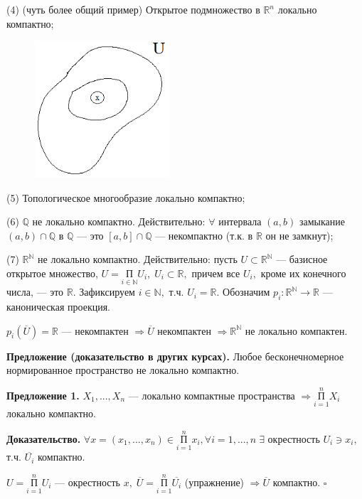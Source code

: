 \documentclass[12pt,a4paper]{article}
\begin{document}
(4) (чуть более общий пример) Открытое подмножество в $\mathbb{R}^{n}$ локально компактно; 

\begin{figure}
	\includegraphics[width = 5cm]{lect10_1.png}
\end{figure}

(5) Топологическое многообразие локально компактно;

(6) $\mathbb{Q}$ не локально компактно. Действительно: $\forall$ интервала $(a, b)$ замыкание $(a, b) \cap \mathbb{Q}$ в $\mathbb{Q}$ --- это $[a, b] \cap \mathbb{Q}$ --- некомпактно (т.к. в $\mathbb{R}$ он не замкнут);

(7) $\mathbb{R^{N}}$ не локально компактно. Действительно: пусть $U \subset \mathbb{R^{N}}$ --- базисное открытое множество, $U = \underset{i \in \mathbb{N}}{\text{П}} U_{i}, \; U_{i} \subset \mathbb{R},$ причем все $U_{i},$ кроме их конечного числа, --- это $\mathbb{R}.$ Зафиксируем $i \in \mathbb{N},$ т.ч. $U_{i} = \mathbb{R}.$ Обозначим $p_{i}\!: \mathbb{R^{N}} \to \mathbb{R}$ --- каноническая проекция. 

$p_{i}(\overline{U}) = \mathbb{R}$ --- некомпактен $\Rightarrow \overline{U}$ некомпактен $\Rightarrow \mathbb{R^{N}}$ не локально компактен.

\textbf{Предложение (доказательство в других курсах).} Любое бесконечномерное нормированное пространство не локально компактно.

\textbf{Предложение 1.} $X_{1}, ..., X_{n}$ --- локально компактные пространства $\Rightarrow \underset{i = 1}{\overset{n}{\text{П}}} X_{i}$ локально компактно.

\textbf{Доказательство.} $\forall x = (x_{1}, ..., x_{n}) \in \overset{n}{\underset{i = 1}{\text{П}}} x_{i}, \forall i = 1, ..., n \; \exists$ окрестность $U_{i} \ni x_{i},$ т.ч. $\overline{U_{i}}$ компактно. 
	
$U = \overset{n}{\underset{i = 1}{\text{П}}} U_{i}$ --- окрестность $x, \; \overline{U} = \overset{n}{\underset{i = 1}{\text{П}}} \overline{U_{i}}$ (упражнение) $\Rightarrow \overline{U}$ компактно. $\square$
	
\end{document}
